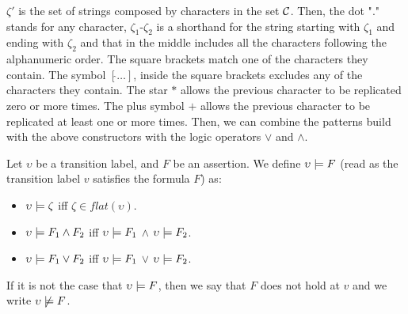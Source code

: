 $\zeta'$ is the set of  strings composed by characters in the set ${\cal C}$.
Then, the dot "$.$" stands for any character, $\zeta_1 \textrm{-}\zeta_2$ is a shorthand for the string
starting with $\zeta_1$ and ending with $\zeta_2$ and that in the  middle includes all the characters
following the alphanumeric order.
 The square brackets match one of the characters they contain.
 The symbol $[\hat{} \dots]$, inside the square brackets excludes any of the characters they contain.
 The star $*$ allows the previous character to be replicated zero or more times.
 The plus symbol $+$ allows the previous character to be replicated at least one or more times.
Then, we can combine the patterns build with the above constructors with the logic operators $\vee$ and
$\wedge$.



\begin{definition}[Semantics]\label{sec:semantics}
Let  $\upsilon$ be  a transition label, and $F$ be an assertion.
We define $\upsilon \models F$ (read as the transition label $v$ satisfies the formula $F$) as: 
\begin{itemize}
 \item   $\upsilon \models \zeta $ iff $\zeta \in flat(\upsilon)$. 
 \item   $\upsilon \models F_1 \wedge F_2$ iff   $\upsilon \models F_1$  $\wedge$  $\upsilon \models F_2$.
\item   $ \upsilon \models F_1 \vee F_2$ iff   $\upsilon \models F_1$  $\vee$  $\upsilon \models F_2$.
\end{itemize}
If it is not the case that $\upsilon \models  F $, then we say that $F$ does not hold at $v$ and we write $\upsilon \not\models F$. 
\end{definition}


